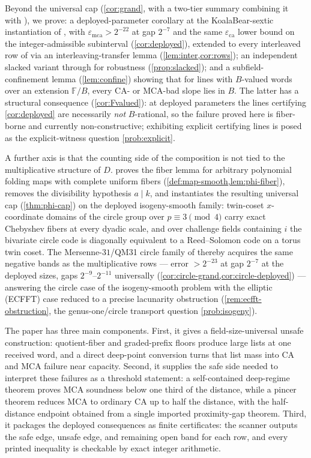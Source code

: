 \documentclass[11pt]{article}
\theoremstyle{definition}
\theoremstyle{remark}
\newcommand{\F}{\mathbb{F}}
\newcommand{\B}{B}
\newcommand{\eca}{\varepsilon_{\mathrm{ca}}}
\newcommand{\emca}{\varepsilon_{\mathrm{mca}}}
\begin{document}
Beyond the universal cap (\cref{cor:grand}, with a two-tier summary combining it with \cite{Cho26b}), we prove: a deployed-parameter corollary at the KoalaBear-sextic instantiation of \cite[\S6.3]{ABF26}, with $\emca>2^{-22}$ at gap $2^{-7}$ and the same $\eca$ lower bound on the integer-admissible subinterval (\cref{cor:deployed}), extended to every interleaved row of \cite[Tables~2--3]{ABF26} via an interleaving-transfer lemma (\cref{lem:inter,cor:rows}); an independent slacked variant through \cite[Thm.~1.9]{BCHKS25} for robustness (\cref{prop:slacked}); and a subfield-confinement lemma (\cref{lem:confine}) showing that for lines with $\B$-valued words over an extension $\F/\B$, every CA- or MCA-bad slope lies in $\B$. The latter has a structural consequence (\cref{cor:Fvalued}): at deployed parameters the lines certifying \cref{cor:deployed} are necessarily \emph{not} $\B$-rational, so the failure proved here is fiber-borne and currently non-constructive; exhibiting explicit certifying lines is posed as the explicit-witness question \cref{prob:explicit}.

A further axis is that the counting side of the composition is not tied to the multiplicative structure of $D$.  proves the fiber lemma for arbitrary polynomial folding maps with complete uniform fibers (\cref{def:map-smooth,lem:phi-fiber}), removes the divisibility hypothesis $a\mid k$, and instantiates the resulting universal cap (\cref{thm:phi-cap}) on the deployed isogeny-smooth family: twin-coset $x$-coordinate domains of the circle group over $p\equiv3\pmod4$ carry exact Chebyshev fibers at every dyadic scale, and over challenge fields containing $i$ the bivariate circle code is diagonally equivalent to a Reed--Solomon code on a torus twin coset. The Mersenne-$31$/QM31 circle family of \cite{HLP24} thereby acquires the same negative bands as the multiplicative rows --- error $>2^{-23}$ at gap $2^{-7}$ at the deployed sizes, gaps $2^{-9}$--$2^{-11}$ universally (\cref{cor:circle-grand,cor:circle-deployed}) --- answering the circle case of the isogeny-smooth problem with the elliptic (ECFFT) case reduced to a precise lacunarity obstruction (\cref{rem:ecfft-obstruction}, the genus-one/circle transport question \cref{prob:isogeny}).

The paper has three main components.  First, it gives a field-size-universal unsafe construction: quotient-fiber and graded-prefix floors produce large lists at one received word, and a direct deep-point conversion turns that list mass into CA and MCA failure near capacity.  Second, it supplies the safe side needed to interpret these failures as a threshold statement: a self-contained deep-regime theorem proves MCA soundness below one third of the distance, while a pincer theorem reduces MCA to ordinary CA up to half the distance, with the half-distance endpoint obtained from a single imported proximity-gap theorem.  Third, it packages the deployed consequences as finite certificates: the scanner outputs the safe edge, unsafe edge, and remaining open band for each row, and every printed inequality is checkable by exact integer arithmetic.
\end{document}

